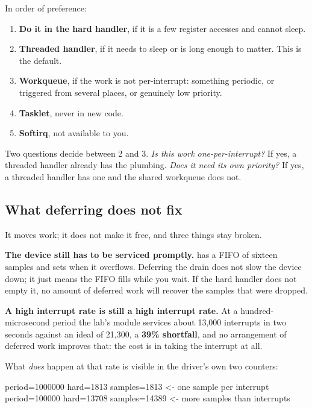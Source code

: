 In order of preference:
\begin{enumerate}
  \item \textbf{Do it in the hard handler}, if it is a few register accesses and cannot sleep.
  \item \textbf{Threaded handler}, if it needs to sleep or is long enough to matter. This is the
    default.
  \item \textbf{Workqueue}, if the work is not per-interrupt: something periodic, or triggered from
    several places, or genuinely low priority.
  \item \textbf{Tasklet}, never in new code.
  \item \textbf{Softirq}, not available to you.
\end{enumerate}
Two questions decide between 2 and 3. \emph{Is this work one-per-interrupt?} If yes, a threaded
handler already has the plumbing. \emph{Does it need its own priority?} If yes, a threaded handler
has one and the shared workqueue does not.

\subsection{What deferring does not fix}
\label{c8:app:b6}

It moves work; it does not make it free, and three things stay broken.

\textbf{The device still has to be serviced promptly.}  has a FIFO of sixteen samples
and sets  when it overflows. Deferring the drain does not slow the device down; it just
means the FIFO fills while you wait. If the hard handler does not empty it, no amount of deferred
work will recover the samples that were dropped.

\textbf{A high interrupt rate is still a high interrupt rate.} At a hundred-microsecond period the
lab's module services about 13,000 interrupts in two seconds against an ideal of 21,300, a
\textbf{39\% shortfall}, and no arrangement of deferred work improves that: the cost is in taking
the interrupt at all.

What \emph{does} happen at that rate is visible in the driver's own two counters:

\begin{console}
period=1000000   hard=1813   samples=1813     <- one sample per interrupt
period=100000    hard=13708  samples=14389    <- more samples than interrupts
\end{console}

